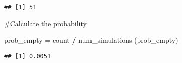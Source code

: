 \documentclass[
]{article}
\newenvironment{Shaded}{\begin{snugshade}}{\end{snugshade}}
\newcommand{\NormalTok}[1]{#1}
\newcommand{\OtherTok}[1]{\textcolor[rgb]{0.56,0.35,0.01}{#1}}
\newcommand{\SpecialCharTok}[1]{\textcolor[rgb]{0.81,0.36,0.00}{\textbf{#1}}}
\begin{document}
\begin{verbatim}
## [1] 51
\end{verbatim}

\#Calculate the probability

\begin{Shaded}
\begin{Highlighting}[]
\NormalTok{prob\_empty }\OtherTok{=}\NormalTok{ count }\SpecialCharTok{/}\NormalTok{ num\_simulations}
\NormalTok{(prob\_empty)}
\end{Highlighting}
\end{Shaded}

\begin{verbatim}
## [1] 0.0051
\end{verbatim}
\end{document}
